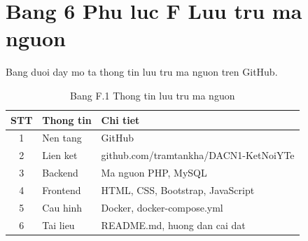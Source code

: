 \section*{Bang 6 Phu luc F Luu tru ma nguon}

Bang duoi day mo ta thong tin luu tru ma nguon tren GitHub.

\begin{table}[H]
\centering
\begin{tabular}{|c|p{3cm}|p{7cm}|}
\hline
STT & Thong tin & Chi tiet \\
\hline
1 & Nen tang & GitHub \\
\hline
2 & Lien ket & github.com/tramtankha/DACN1-KetNoiYTe \\
\hline
3 & Backend & Ma nguon PHP, MySQL \\
\hline
4 & Frontend & HTML, CSS, Bootstrap, JavaScript \\
\hline
5 & Cau hinh & Docker, docker-compose.yml \\
\hline
6 & Tai lieu & README.md, huong dan cai dat \\
\hline
\end{tabular}
\caption*{Bang F.1 Thong tin luu tru ma nguon}
\end{table}

